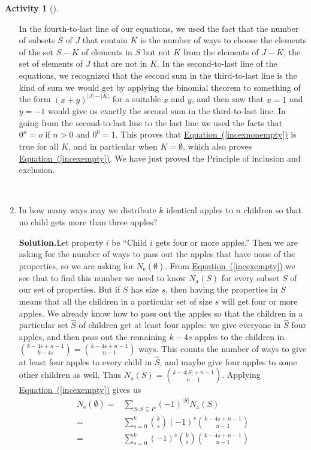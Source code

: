 \documentclass[10pt,]{book}
\theoremstyle{plain}
\theoremstyle{definition}
\newtheorem{activity}[project]{Activity}
\numberwithin{equation}{chapter}
\newcommand{\amp}{&}
\begin{document}
\begin{activity}[]
\begin{enumerate}[label=(\alph*)]
%
\par
In the fourth-to-last line of our equations, we used the fact that the number of subsets \(S\) of \(J\) that contain \(K\) is the number of ways to choose the elements of the set \(S-K\) of elements in \(S\) but not \(K\) from the elements of \(J-K\), the set of elements of \(J\) that are not in \(K\). In the second-to-last line of the equations, we recognized that the second sum in the third-to-last line is the kind of sum we would get by applying the binomial theorem to something of the form \((x+y)^{|J|-|K|}\) for a suitable \(x\) and \(y\), and then saw that \(x=1\) and \(y=-1\) would give us exactly the second sum in the third-to-last line. In going from the second-to-last line to the last line we used the facts that \(0^n=o\) if \(n>0\) and \(0^0=1\). This proves that \hyperref[incexnonempty]{Equation~(\ref{incexnonempty})} is true for all \(K\), and in particular when \(K=\emptyset\), which also proves \hyperref[incexempty]{Equation~(\ref{incexempty})}. We have just proved the Principle of inclusion and exclusion.%

~\par
\item In how many ways may we distribute \(k\) identical apples to \(n\) children so that no child gets more than three apples?%
\par\medskip\noindent%
\textbf{Solution.}\quad Let property \(i\) be ``Child \(i\) gets four or more apples.'' Then we are asking for the number of ways to pass out the apples that have none of the properties, so we are asking for \(N_{\mbox{e} }(\emptyset)\). From \hyperref[incexempty]{Equation~(\ref{incexempty})} we see that to find this number we need to know \(N_{\mbox{a} }(S)\) for every subset \(S\) of our set of properties. But if \(S\) has size \(s\), then having the properties in \(S\) means that all the children in a particular set of size \(s\) will get four or more apples. We already know how to pass out the apples so that the children in a particular set \(\hat S\) of children get at least four apples: we give everyone in \(\hat
S\) four apples, and then pass out the remaining \(k-4s\) apples to the children in \(\binom{k-4s+n-1}{k-4s}= \binom{k-4s+n-1}{n-1}\) ways. This counts the number of ways to give at least four apples to every child in \(\hat S\), and maybe give four apples to some other children as well. Thus \(N_{\mbox{a} }(S) = \binom{k-4|S|+n-1}{n-1}\). Applying \hyperref[incexempty]{Equation~(\ref{incexempty})} gives us%
\begin{align*}
N_{\mbox{e} }(\emptyset) =\amp \sum_{S:S\subseteq
P}(-1)^{|S|}N_{\mbox{a} }(S)\\
=\amp \sum_{s=0}^k \binom{k}{s}(-1)^s \binom{k-4s+n-1}{n-1}\\
=\amp \sum_{s=0}^k (-1)^s\binom{k}{s}\binom{k-4s+n-1}{n-1}
\end{align*}
%

\end{enumerate}
\end{activity}
\end{document}
